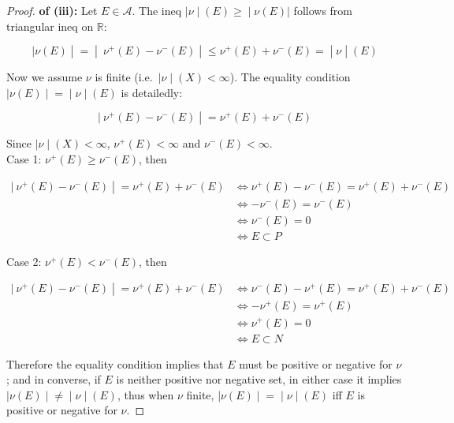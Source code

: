 \begin{proof}

\textbf{of (iii):} Let \(E \in \mathcal{A}\). The ineq \(\left. |\nu \middle| (E) \geq \middle| \nu(E)| \right.\) follows from triangular ineq on \(\mathbb{R}\):

\[\left. |\nu(E) \middle| = \middle| \ \nu^{+}(E) - \nu^{-}(E) \middle| \leq \nu^{+}(E) + \nu^{-}(E) = \middle| \nu \middle| (E) \right.\]

Now we assume \(\nu\) is finite (i.e.~\(\left. |\nu \middle| (X) < \infty \right.\)). The equality condition \(\left. |\nu(E) \middle| = \middle| \nu \middle| (E) \right.\) is detailedly:

\[\left. |\ \nu^{+}(E) - \nu^{-}(E) \middle| = \nu^{+}(E) + \nu^{-}(E) \right.\]

Since \(\left. |\nu \middle| (X) < \infty \right.\), \(\nu^{+}(E) < \infty\) and \(\nu^{-}(E) < \infty\).\\
Case 1: \(\nu^{+}(E) \geq \nu^{-}(E)\), then

\[\begin{matrix}
\left. |\ \nu^{+}(E) - \nu^{-}(E) \middle| = \nu^{+}(E) + \nu^{-}(E) \right. & {\Leftrightarrow\nu^{+}(E) - \nu^{-}(E) = \nu^{+}(E) + \nu^{-}(E)} \\
 & {\Leftrightarrow - \nu^{-}(E) = \nu^{-}(E)} \\
 & {\Leftrightarrow\nu^{-}(E) = 0} \\
 & {\Leftrightarrow E \subset P}
\end{matrix}\]

Case 2: \(\nu^{+}(E) < \nu^{-}(E)\), then

\[\begin{matrix}
\left. |\ \nu^{+}(E) - \nu^{-}(E) \middle| = \nu^{+}(E) + \nu^{-}(E) \right. & {\Leftrightarrow\nu^{-}(E) - \nu^{+}(E) = \nu^{+}(E) + \nu^{-}(E)} \\
 & {\Leftrightarrow - \nu^{+}(E) = \nu^{+}(E)} \\
 & {\Leftrightarrow\nu^{+}(E) = 0} \\
 & {\Leftrightarrow E \subset N}
\end{matrix}\]

Therefore the equality condition implies that \(E\) must be positive or negative for \(\nu\); and in converse, if \(E\) is neither positive nor negative set, in either case it implies \(\left. |\nu(E) \middle| \neq \middle| \nu \middle| (E) \right.\), thus when \(\nu\) finite, \(\left. |\nu(E) \middle| = \middle| \nu \middle| (E) \right.\) iff \(E\) is positive or negative for \(\nu\).

\end{proof}

